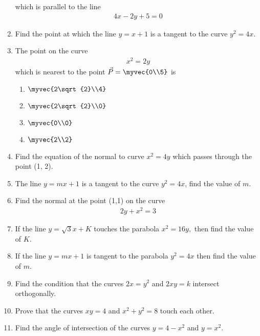 \begin{enumerate}[label=\thesubsection.\arabic*,ref=\thesubsection.\theenumi]
which is parallel to the line
\begin{align}
	4x-2y+5 = 0
\end{align}
\item 
Find the point at which the line $y = x + 1$ is a tangent to the curve $y^2 = 4x$.
    \item The point on the curve 
\label{chapters/12/6/5/27}
    \begin{align}
        x^2 = 2y
        \label{eq:chapters/12/6/5/27/curve}
    \end{align}
    which is nearest to the point 
    $\vec{P} = \myvec{0\\5}$ is
    \begin{enumerate}
        \item $\myvec{2\sqrt{2}\\4}$
        \item $\myvec{2\sqrt{2}\\0}$
        \item $\myvec{0\\0}$
        \item $\myvec{2\\2}$
    \end{enumerate}
    \solution 

\item 
Find the equation of the normal to curve $x^2 = 4y$ which passes through the point
(1, 2).
\\
\solution 
\label{chapters/12/6/6/4}

\item 
 The line $y=mx+1$ is a tangent to the curve $y^2 = 4x$, find the value of $m$. 
 \\
 \solution 
\label{chapters/12/6/6/21}

\item 
\label{chapters/12/6/6/22}
Find the normal at the point (1,1) on the curve 
\begin{align}
2y+x^2=3
\end{align}
\solution

 \item If the line $y=\sqrt{3}x+K$ touches the parabola $x^2=16y,$ then find the value of $K$.
\item If the line $y=mx+1$ is tangent to the parabola $y^2=4x$ then find the value of $m$.
\item Find the condition that the curves $2x=y^2$ and $2xy=k$ intersect orthogonally.
\item Prove that the curves $xy=4$ and $x^2+y^2=8$ touch each other.
\item Find the angle of intersection of the curves $y=4-x^2$ and $y=x^2$.

\end{enumerate}
